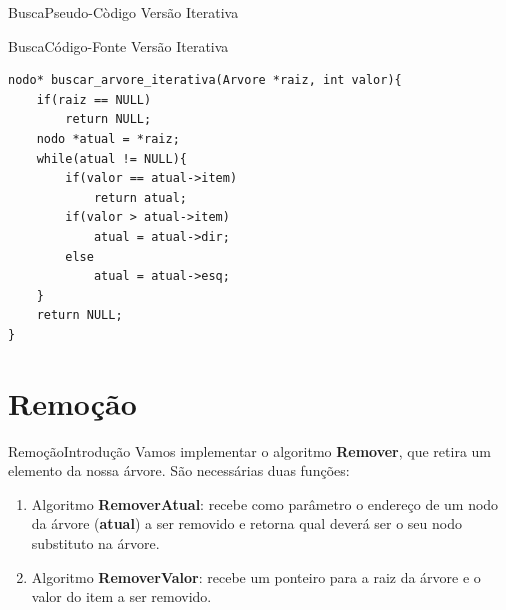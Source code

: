 \documentclass[aspectratio=169]{beamer}
\begin{document}

\begin{frame}{Busca}{Pseudo-Còdigo Versão Iterativa}
\end{frame}


\begin{frame}[fragile]{Busca}{Código-Fonte Versão Iterativa}
\begin{lstlisting}[style=CStyle,basicstyle=\small]
nodo* buscar_arvore_iterativa(Arvore *raiz, int valor){
    if(raiz == NULL)
        return NULL;
    nodo *atual = *raiz;
    while(atual != NULL){
        if(valor == atual->item)
            return atual;
        if(valor > atual->item)
            atual = atual->dir;
        else
            atual = atual->esq;
    }
    return NULL;
}
\end{lstlisting}  
\end{frame}

\section{Remoção}

\begin{frame}{Remoção}{Introdução}
Vamos implementar o algoritmo {\bf Remover}, que retira um elemento da nossa árvore. São necessárias duas funções: 
\begin{enumerate}
 \item Algoritmo {\bf RemoverAtual}: recebe como parâmetro o endereço de um nodo da árvore ({\bf atual}) a ser removido e retorna qual deverá ser o seu nodo substituto na árvore.
 \item Algoritmo {\bf RemoverValor}: recebe um ponteiro para a raiz da árvore e o valor do item a ser removido.
\end{enumerate}
\end{frame}
\end{document}
